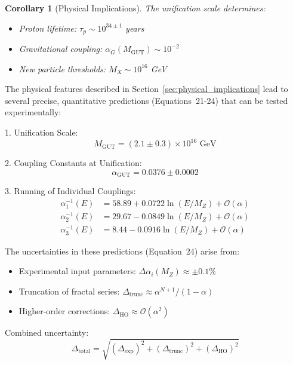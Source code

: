 \documentclass[12pt]{article}
\newtheorem{corollary}[theorem]{Corollary}
\begin{document}
\begin{corollary}[Physical Implications]
The unification scale determines:
\begin{itemize}
\item Proton lifetime: $\tau_p \sim 10^{34\pm 1}$ years
\item Gravitational coupling: $\alpha_G(M_{\text{GUT}}) \sim 10^{-2}$
\item New particle thresholds: $M_X \sim 10^{16}$ GeV
\end{itemize}
\end{corollary}

The physical features described in Section~\ref{sec:physical_implications} lead to several precise, quantitative predictions (Equations~21-24) that can be tested experimentally:

1. Unification Scale:
   \begin{equation}
   M_{\text{GUT}} = (2.1 \pm 0.3) \times 10^{16} \text{ GeV}
   \end{equation}

2. Coupling Constants at Unification:
   \begin{equation}
   \alpha_{\text{GUT}} = 0.0376 \pm 0.0002
   \end{equation}

3. Running of Individual Couplings:
   \begin{align}
   \alpha_1^{-1}(E) &= 58.89 + 0.0722\ln(E/M_Z) + \mathcal{O}(\alpha) \\
   \alpha_2^{-1}(E) &= 29.67 - 0.0849\ln(E/M_Z) + \mathcal{O}(\alpha) \\
   \alpha_3^{-1}(E) &= 8.44 - 0.0916\ln(E/M_Z) + \mathcal{O}(\alpha)
   \end{align}

The uncertainties in these predictions (Equation~24) arise from:

\begin{itemize}
\item Experimental input parameters: $\Delta\alpha_i(M_Z) \approx \pm 0.1\%$
\item Truncation of fractal series: $\Delta_{\text{trunc}} \approx \alpha^{N+1}/(1-\alpha)$
\item Higher-order corrections: $\Delta_{\text{HO}} \approx \mathcal{O}(\alpha^2)$
\end{itemize}

Combined uncertainty:
\begin{equation}
\Delta_{\text{total}} = \sqrt{(\Delta_{\text{exp}})^2 + (\Delta_{\text{trunc}})^2 + (\Delta_{\text{HO}})^2}
\end{equation}
\end{document}

